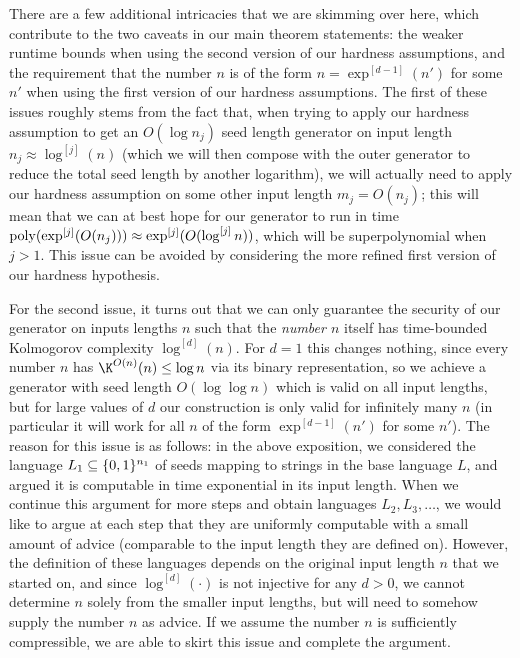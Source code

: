 There are a few additional intricacies that we are skimming over here, which contribute to the two caveats in our main theorem statements: the weaker runtime bounds when using the second version of our hardness assumptions, and the requirement that the number $n$ is of the form $n = \exp^{[d-1]}(n')$ for some $n'$ when using the first version of our hardness assumptions. The first of these issues roughly stems from the fact that, when trying to apply our hardness assumption to get an $O(\log n_j)$ seed length generator on input length $n_j \approx \log^{[j]}(n)$ (which we will then compose with the outer generator to reduce the total seed length by another logarithm), we will actually need to apply our hardness assumption on some other input length $m_j = O(n_j)$; this will mean that we can at best hope for our generator to run in time $\mathrm{poly}(\exp^{[j]}(O(n_j))) \approx \exp^{[j]}(O(\log^{[j]}n))$, which will be superpolynomial when $j>1$. This issue can be avoided by considering the more refined first version of our hardness hypothesis.

For the second issue, it turns out that we can only guarantee the security of our generator on inputs lengths $n$ such that the \emph{number $n$} itself has time-bounded Kolmogorov complexity $\log^{[d]}(n)$. For $d = 1$ this changes nothing, since every number $n$ has $\K^{O(n)}(n) \leq \log n$ via its binary representation, so we achieve a generator with seed length $O(\log \log n)$ which is valid on all input lengths, but for large values of $d$ our construction is only valid for infinitely many $n$ (in particular it will work for all $n$ of the form $\exp^{[d-1]}(n')$ for some $n'$). The reason for this issue is as follows: in the above exposition, we considered the language $L_1 \subseteq \{0,1\}^{n_1}$ of seeds mapping to strings in the base language $L$, and argued it is computable in time exponential in its input length. When we continue this argument for more steps and obtain languages $L_2,L_3,\ldots$, we would like to argue at each step that they are uniformly computable with a small amount of advice (comparable to the input length they are defined on). However, the definition of these languages depends on the original input length $n$ that we started on, and since $\log^{[d]}(\cdot)$ is not injective for any $d > 0$, we cannot determine $n$ solely from the smaller input lengths, but will need to somehow supply the number $n$ as advice. If we assume the number $n$ is sufficiently compressible, we are able to skirt this issue and complete the argument. 


